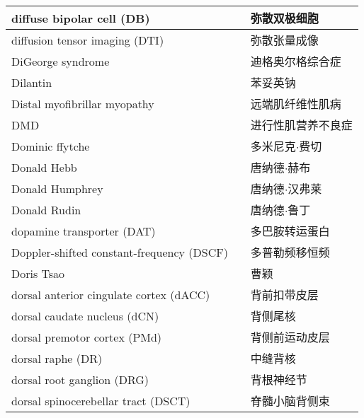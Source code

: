 \begin{longtable}{lll}
	\midrule
	diffuse bipolar cell (DB)    &&  弥散双极细胞  \\
	
	\midrule
	diffusion tensor imaging (DTI)    &&  弥散张量成像  \\
	
	\midrule
	DiGeorge syndrome    &&  迪格奥尔格综合症  \\
	
	\midrule
	Dilantin    &&  苯妥英钠  \\
	
	\midrule
	Distal myofibrillar myopathy    &&  远端肌纤维性肌病  \\
	
	\midrule
	DMD    &&  进行性肌营养不良症  \\
	
	\midrule
	Dominic ffytche    &&  多米尼克$\cdot$费切  \\
	
	\midrule
	Donald Hebb    &&  唐纳德$\cdot$赫布  \\
	
	\midrule
	Donald Humphrey    &&  唐纳德$\cdot$汉弗莱  \\
	
	\midrule
	Donald Rudin    &&  唐纳德$\cdot$鲁丁  \\
	
	\midrule
	dopamine transporter (DAT)     &&  多巴胺转运蛋白  \\
	
	\midrule
	Doppler-shifted constant-frequency (DSCF)     &&  多普勒频移恒频  \\
	
	\midrule
	Doris Tsao     &&  曹颖  \\
	
	\midrule
	dorsal anterior cingulate cortex (dACC)     &&  背前扣带皮层  \\
	
	\midrule
	dorsal caudate nucleus (dCN)     &&  背侧尾核  \\
	
	\midrule
	dorsal premotor cortex (PMd)     &&  背侧前运动皮层  \\
	
	\midrule
	dorsal raphe (DR)     &&  中缝背核  \\
	
	\midrule
	dorsal root ganglion (DRG)     &&  背根神经节  \\
	
	\midrule
	dorsal spinocerebellar tract (DSCT)     &&  脊髓小脑背侧束  \\
	

\end{longtable}
